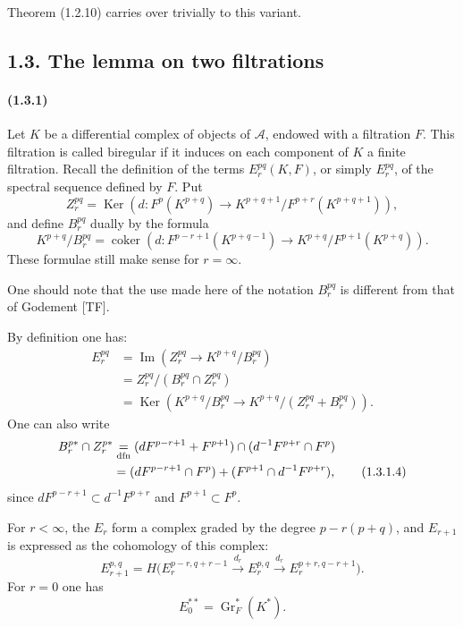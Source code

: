 \documentclass[10pt]{article}
\newcommand{\Gr}{\operatorname{Gr}}
\newcommand{\Ker}{\operatorname{Ker}}
\newcommand{\Imop}{\operatorname{Im}}
\newcommand{\coker}{\operatorname{coker}}
\newcommand{\calA}{\mathcal A}
\begin{document}
Theorem (1.2.10) carries over trivially to this variant.

\subsection*{1.3. The lemma on two filtrations}

\paragraph{(1.3.1)} Let $K$ be a differential complex of objects of $\calA$, endowed with a filtration $F$. This filtration is called biregular if it induces on each component of $K$ a finite filtration. Recall the definition of the terms $E_r^{pq}(K,F)$, or simply $E_r^{pq}$, of the spectral sequence defined by $F$. Put
\[
Z_r^{pq}=\Ker\left(d:F^p(K^{p+q})\to K^{p+q+1}/F^{p+r}(K^{p+q+1})\right),
\]
and define $B_r^{pq}$ dually by the formula
\[
K^{p+q}/B_r^{pq}=\coker\left(d:F^{p-r+1}(K^{p+q-1})\to K^{p+q}/F^{p+1}(K^{p+q})\right).
\]
These formulae still make sense for $r=\infty$.

One should note that the use made here of the notation $B_r^{pq}$ is different from that of Godement [TF].

By definition one has:
\begin{align}
E_r^{pq}&=\Imop\left(Z_r^{pq}\to K^{p+q}/B_r^{pq}\right) \tag{1.3.1.1}\\
&=Z_r^{pq}/(B_r^{pq}\cap Z_r^{pq}) \tag{1.3.1.2}\\
&=\Ker\left(K^{p+q}/B_r^{pq}\to K^{p+q}/(Z_r^{pq}+B_r^{pq})\right). \tag{1.3.1.3}
\end{align}
One can also write
\begin{align}
B_r^{p*}\cap Z_r^{p*}
&\underset{\mathrm{dfn}}{=}(dF^{p-r+1}+F^{p+1})\cap(d^{-1}F^{p+r}\cap F^p) \notag\\
&=(dF^{p-r+1}\cap F^p)+(F^{p+1}\cap d^{-1}F^{p+r}), \tag{1.3.1.4}
\end{align}
since $dF^{p-r+1}\subset d^{-1}F^{p+r}$ and $F^{p+1}\subset F^p$.


For $r<\infty$, the $E_r$ form a complex graded by the degree $p-r(p+q)$, and $E_{r+1}$ is expressed as the cohomology of this complex:
\[
\tag{1.3.1.5}
E_{r+1}^{p,q}=H\bigl(E_r^{p-r,q+r-1}\xrightarrow{d_r}E_r^{p,q}\xrightarrow{d_r}E_r^{p+r,q-r+1}\bigr).
\]
For $r=0$ one has
\[
\tag{1.3.1.6}
E_0^{**}=\Gr_F^*(K^*).
\]
\end{document}
